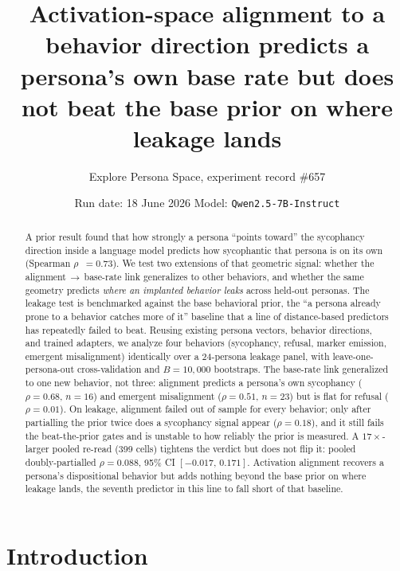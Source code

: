 \documentclass[11pt]{article}
\title{\vspace{-2.5em}Activation-space alignment to a behavior direction predicts a
persona's own base rate but does not beat the base prior on where leakage lands}
\author{Explore Persona Space, experiment record \#657}
\date{Run date: 18 June 2026 \quad\textbar\quad Model: \texttt{Qwen2.5-7B-Instruct}}
\let\mathrho\rho
\renewcommand{\rho}{\ensuremath{\mathrho}}
\begin{document}
\maketitle
\vspace{-1.5em}

\begin{abstract}
\noindent
A prior result found that how strongly a persona ``points toward'' the sycophancy
direction inside a language model predicts how sycophantic that persona is on its
own (Spearman \rho{}~$=0.73$). We test two extensions of that geometric signal:
whether the alignment\,$\to$\,base-rate link generalizes to other behaviors, and
whether the same geometry predicts \emph{where an implanted behavior leaks}
across held-out personas. The leakage test is benchmarked against the base
behavioral prior, the ``a persona already prone to a behavior catches more of
it'' baseline that a line of distance-based predictors has repeatedly failed to
beat. Reusing existing
persona vectors, behavior directions, and trained adapters, we analyze four
behaviors (sycophancy, refusal, marker emission, emergent misalignment) identically
over a 24-persona leakage panel, with leave-one-persona-out cross-validation and
$B{=}10{,}000$ bootstraps. The base-rate link generalized to one new behavior, not
three: alignment predicts a persona's own sycophancy ($\rho{=}0.68$, $n{=}16$) and
emergent misalignment ($\rho{=}0.51$, $n{=}23$) but is flat for refusal
($\rho{=}0.01$). On leakage, alignment failed out of sample for every behavior; only
after partialling the prior twice does a sycophancy signal appear ($\rho{=}0.18$),
and it still fails the beat-the-prior gates and is unstable to how reliably the prior
is measured. A $17\times$-larger pooled re-read (399 cells) tightens the verdict but
does not flip it: pooled doubly-partialled $\rho{=}0.088$, 95\% CI $[-0.017,\,0.171]$.
Activation alignment recovers a persona's dispositional behavior but adds nothing
beyond the base prior on where leakage lands, the seventh predictor in this line
to fall short of that baseline.
\end{abstract}

\section{Introduction}
\label{sec:intro}
\end{document}
